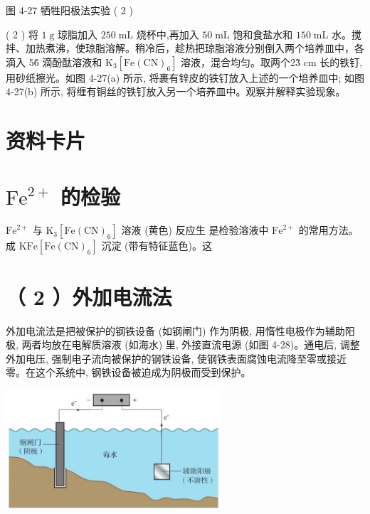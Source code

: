 \documentclass[10pt]{article}
\begin{document}
图 4-27 牺牲阳极法实验 ( 2 )

\begin{center}
\end{center}

( 2 ) 将 \(1\mathrm{\;g}\) 琼脂加入 \({250}\mathrm{\;{mL}}\) 烧杯中,再加入 \({50}\mathrm{\;{mL}}\) 饱和食盐水和 \({150}\mathrm{\;{mL}}\) 水。搅拌、加热煮沸，使琼脂溶解。稍冷后，趁热把琼脂溶液分别倒入两个培养皿中，各滴入 5\~6 滴酚酞溶液和 \({\mathrm{K}}_{3}\left\lbrack {\mathrm{{Fe}}{\left( \mathrm{{CN}}\right) }_{6}}\right\rbrack\) 溶液，混合均匀。取两个2\~3 cm 长的铁钉, 用砂纸擦光。如图 4-27(a) 所示, 将裹有锌皮的铁钉放入上述的一个培养皿中; 如图 4-27(b) 所示, 将缠有铜丝的铁钉放入另一个培养皿中。观察并解释实验现象。

\section*{资料卡片}

\section*{\({\mathrm{{Fe}}}^{2 + }\) 的检验}

\({\mathrm{{Fe}}}^{2 + }\) 与 \({\mathrm{K}}_{3}\left\lbrack {\mathrm{{Fe}}{\left( \mathrm{{CN}}\right) }_{6}}\right\rbrack\) 溶液 (黄色) 反应生 是检验溶液中 \({\mathrm{{Fe}}}^{2 + }\) 的常用方法。 成 \(\mathrm{{KFe}}\left\lbrack {\mathrm{{Fe}}{\left( \mathrm{{CN}}\right) }_{6}}\right\rbrack\) 沉淀 (带有特征蓝色)。这

\section*{（ 2 ）外加电流法}

外加电流法是把被保护的钢铁设备 (如钢闸门) 作为阴极, 用惰性电极作为辅助阳极, 两者均放在电解质溶液 (如海水) 里, 外接直流电源 (如图 4-28)。通电后, 调整外加电压, 强制电子流向被保护的钢铁设备, 使钢铁表面腐蚀电流降至零或接近零。在这个系统中, 钢铁设备被迫成为阴极而受到保护。

\begin{center}
\includegraphics[max width=0.6\textwidth]{images/0190da9d-8bfd-732f-bc2c-0b21d0f13b91_120_720876.jpg}
\end{center}
\end{document}

